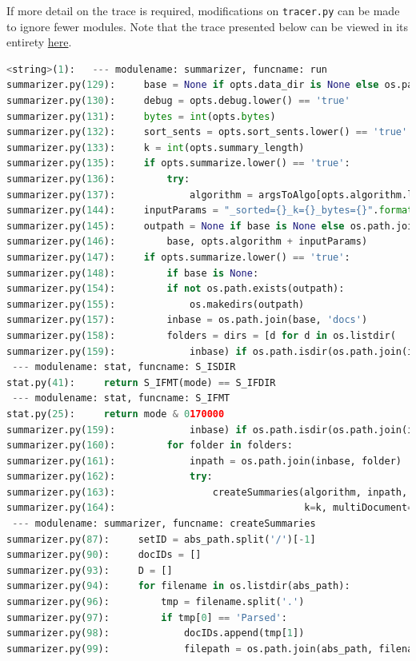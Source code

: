 \documentclass[11pt]{article}
\begin{document}
If more detail on the trace is required, modifications on \verb|tracer.py| can be made to ignore fewer modules. Note that the trace presented below can be viewed in its entirety \href{https://raw.githubusercontent.com/kandluis/document_summaries/master/trace.out}{here}.
\begin{lstlisting}[breaklines,language=Python]
<string>(1):   --- modulename: summarizer, funcname: run
summarizer.py(129):     base = None if opts.data_dir is None else os.path.abspath(opts.data_dir)
summarizer.py(130):     debug = opts.debug.lower() == 'true'
summarizer.py(131):     bytes = int(opts.bytes)
summarizer.py(132):     sort_sents = opts.sort_sents.lower() == 'true'
summarizer.py(133):     k = int(opts.summary_length)
summarizer.py(135):     if opts.summarize.lower() == 'true':
summarizer.py(136):         try:
summarizer.py(137):             algorithm = argsToAlgo[opts.algorithm.lower()]
summarizer.py(144):     inputParams = "_sorted={}_k={}_bytes={}".format(sort_sents, k, bytes)
summarizer.py(145):     outpath = None if base is None else os.path.join(
summarizer.py(146):         base, opts.algorithm + inputParams)
summarizer.py(147):     if opts.summarize.lower() == 'true':
summarizer.py(148):         if base is None:
summarizer.py(154):         if not os.path.exists(outpath):
summarizer.py(155):             os.makedirs(outpath)
summarizer.py(157):         inbase = os.path.join(base, 'docs')
summarizer.py(158):         folders = dirs = [d for d in os.listdir(
summarizer.py(159):             inbase) if os.path.isdir(os.path.join(inbase, d))]
 --- modulename: stat, funcname: S_ISDIR
stat.py(41):     return S_IFMT(mode) == S_IFDIR
 --- modulename: stat, funcname: S_IFMT
stat.py(25):     return mode & 0170000
summarizer.py(159):             inbase) if os.path.isdir(os.path.join(inbase, d))]
summarizer.py(160):         for folder in folders:
summarizer.py(161):             inpath = os.path.join(inbase, folder)
summarizer.py(162):             try:
summarizer.py(163):                 createSummaries(algorithm, inpath, outpath, sort_sents, bytes=bytes,
summarizer.py(164):                                 k=k, multiDocument=True)
 --- modulename: summarizer, funcname: createSummaries
summarizer.py(87):     setID = abs_path.split('/')[-1]
summarizer.py(90):     docIDs = []
summarizer.py(93):     D = []
summarizer.py(94):     for filename in os.listdir(abs_path):
summarizer.py(96):         tmp = filename.split('.')
summarizer.py(97):         if tmp[0] == 'Parsed':
summarizer.py(98):             docIDs.append(tmp[1])
summarizer.py(99):             filepath = os.path.join(abs_path, filename)

\end{lstlisting}
\end{document}
